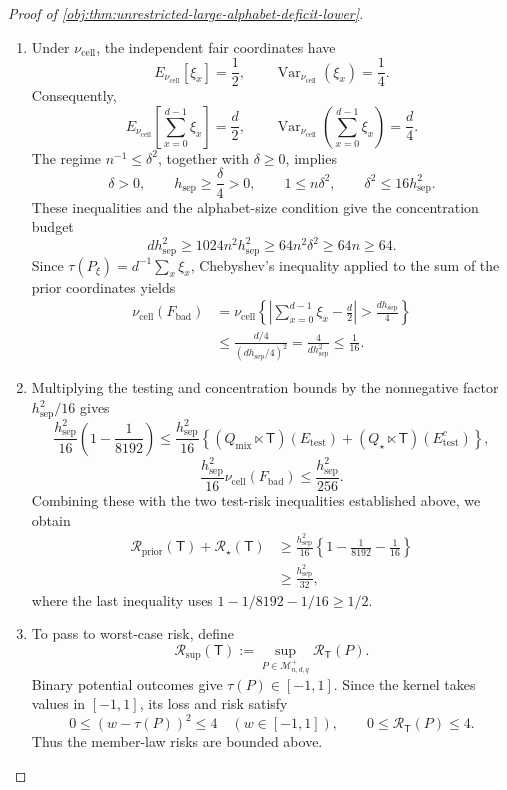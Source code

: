 \documentclass[11pt]{article}
\begin{document}
\begin{proof}[Proof of \cref{obj:thm:unrestricted-large-alphabet-deficit-lower}]
\begin{enumerate}
\item Under \(\nu_{\mathrm{cell}}\), the independent fair coordinates have
\[
E_{\nu_{\mathrm{cell}}}[\xi_x]=\frac12,
\qquad
\operatorname{Var}_{\nu_{\mathrm{cell}}}(\xi_x)=\frac14.
\]
Consequently,
\[
E_{\nu_{\mathrm{cell}}}\!\left[\sum_{x=0}^{d-1}\xi_x\right]
=\frac d2,
\qquad
\operatorname{Var}_{\nu_{\mathrm{cell}}}
\!\left(\sum_{x=0}^{d-1}\xi_x\right)
=\frac d4.
\]
The regime \(n^{-1}\le\delta^2\), together with \(\delta\ge0\), implies
\[
\delta>0,\qquad h_{\mathrm{sep}}\ge\frac{\delta}{4}>0,
\qquad
1\le n\delta^2,\qquad
\delta^2\le16h_{\mathrm{sep}}^2.
\]
These inequalities and the alphabet-size condition give the concentration budget
\[
d h_{\mathrm{sep}}^2
\ge1024n^2h_{\mathrm{sep}}^2
\ge64n^2\delta^2
\ge64n
\ge64.
\]
Since \(\tau(P_\xi)=d^{-1}\sum_x\xi_x\), Chebyshev's inequality applied to the sum of the prior coordinates yields
\[
\begin{aligned}
\nu_{\mathrm{cell}}(F_{\mathrm{bad}})
&=
\nu_{\mathrm{cell}}
\left\{
\left|\sum_{x=0}^{d-1}\xi_x-\frac d2\right|
>\frac{d h_{\mathrm{sep}}}{4}
\right\}
\\
&\le
\frac{d/4}{(d h_{\mathrm{sep}}/4)^2}
=
\frac4{d h_{\mathrm{sep}}^2}
\le\frac1{16}.
\end{aligned}
\]

\item Multiplying the testing and concentration bounds by the nonnegative factor \(h_{\mathrm{sep}}^2/16\) gives
\[
\frac{h_{\mathrm{sep}}^2}{16}
\left(1-\frac1{8192}\right)
\le
\frac{h_{\mathrm{sep}}^2}{16}
\left\{
(Q_{\mathrm{mix}}\ltimes\mathsf T)(E_{\mathrm{test}})
+
(Q_\star\ltimes\mathsf T)(E_{\mathrm{test}}^c)
\right\},
\]
\[
\frac{h_{\mathrm{sep}}^2}{16}
\nu_{\mathrm{cell}}(F_{\mathrm{bad}})
\le\frac{h_{\mathrm{sep}}^2}{256}.
\]
Combining these with the two test-risk inequalities established above, we obtain
\[
\begin{aligned}
\mathcal R_{\mathrm{prior}}(\mathsf T)
+\mathcal R_\star(\mathsf T)
&\ge
\frac{h_{\mathrm{sep}}^2}{16}
\left\{
1-\frac1{8192}-\frac1{16}
\right\}
\\
&\ge\frac{h_{\mathrm{sep}}^2}{32},
\end{aligned}
\]
where the last inequality uses
\(1-1/8192-1/16\ge1/2\). %

\item To pass to worst-case risk, define
\[
\mathcal R_{\mathrm{sup}}(\mathsf T)
:=
\sup_{P\in\mathcal M^{+}_{n,d,q}}
\mathcal R_{\mathsf T}(P).
\]
Binary potential outcomes give \(\tau(P)\in[-1,1]\). Since the kernel takes values in \([-1,1]\), its loss and risk satisfy
\[
0\le(w-\tau(P))^2\le4
\quad(w\in[-1,1]),
\qquad
0\le\mathcal R_{\mathsf T}(P)\le4.
\]
Thus the member-law risks are bounded above.


\end{enumerate}
\end{proof}
\end{document}
